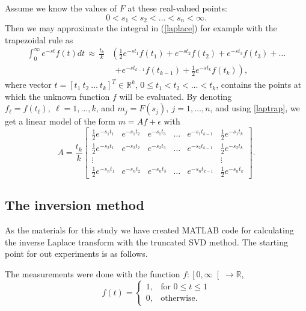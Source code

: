 \documentclass[12pt,a4]{article}
\newcommand{\R}{{\mathbb R}}
\newcommand{\ra}{\rightarrow}
\begin{document}
Assume we know the values of $F$ at these real-valued points:
$$
 0<s_1<s_2<\ldots <s_n<\infty.
$$ 
Then we may approximate the integral in (\ref{laplace}) for example with the trapezoidal rule as
\begin{equation} \label{laptrap}
\begin{split}
 \int_0^\infty e^{-st}f(t)dt\, \approx\, \frac{t_k}{k} & \left( \frac{1}{2}e^{-st_1}f(t_1)+e^{-st_2}f(t_2)+e^{-st_3}f(t_3)+\ldots\right.\\   &\ \ \left. +e^{-st_{k-1}}f(t_{k-1})+\frac{1}{2}e^{-st_k}f(t_k)\right) ,
\end{split}
\end{equation}
where vector $t=[t_1\ t_2\ \ldots\ t_k]^T\in\R^k$, $0\leq t_1<t_2<\ldots <t_k$, contains the points at which the unknown function $f$ will be evaluated. By denoting $f_\ell=f(t_\ell), \ \ell=1,\ldots ,k$, and $m_j=F(s_j),\ j=1,\ldots ,n$, and using \eqref{laptrap}, we get a linear model of the form $m=Af+\epsilon$ with
\begin{equation}\label{LaplaceA} 
A = \frac{t_k}{k}\begin{bmatrix} \frac{1}{2}e^{-s_1t_1} & e^{-s_1t_2} & e^{-s_1t_3} & \ldots & e^{-s_1t_{k-1}} & \frac{1}{2}e^{-s_1t_k} \\
                       \frac{1}{2}e^{-s_2t_1} & e^{-s_2t_2} & e^{-s_2t_3} & \ldots & e^{-s_2t_{k-1}} & \frac{1}{2}e^{-s_2t_k} \\
                       \vdots & & & & & \vdots \\
                       \frac{1}{2}e^{-s_nt_1} & e^{-s_nt_2} & e^{-s_nt_3} & \ldots & e^{-s_nt_{k-1}} & \frac{1}{2}e^{-s_nt_k} \end{bmatrix}.
\end{equation}


\subsection{The inversion method}
\label{sec:invmethod}

As the materials for this study we have created MATLAB code for calculating the inverse Laplace transform with the truncated SVD method. The starting point for out experiments is as follows.

The measurements were done with the function $f: \left[ 0, \infty \right[ \ra \R$,
\begin{equation}\label{eq:f}
f(t) = 
\begin{cases}
1, & \text{for } 0 \leq t \leq 1 \\
0, & \text{otherwise}.
\end{cases}
\end{equation}
\end{document}
